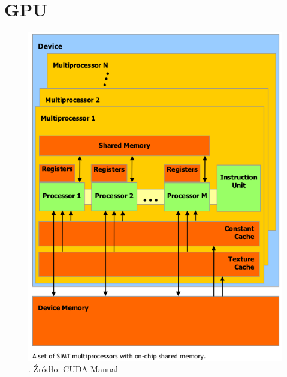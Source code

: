 \section{GPU}

\begin{figure}[ht]
\centering
\includegraphics[scale=0.8]{images/gpu.png}
\caption{.  Źródło: CUDA Manual}
\label{proce}
\end{figure}



